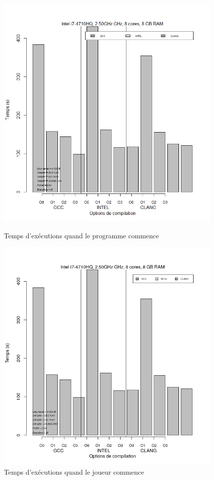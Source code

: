 \documentclass[
 aip,
 jmp,
 amsmath,amssymb,
 reprint
]{revtex4-1}
\begin{document}
\begin{figure}[H]
  \includegraphics[width=\linewidth, keepaspectratio=true]{GCCvsICCvsCLANG_j2.png}
  \caption{Temps d'exécutions quand le programme commence\label{Fig:temps_exec_j2}}
  \includegraphics[width=\linewidth, keepaspectratio=true]{GCCvsICCvsCLANG_j1.png}
  \caption{Temps d'exécutions quand le joueur commence\label{Fig:temps_exec_j1}}
\end{figure}
\end{document}
